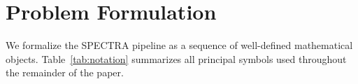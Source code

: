 %
%

\section{Problem Formulation}
\label{sec:problem}

We formalize the \textsc{SPECTRA} pipeline as a sequence of well-defined
mathematical objects.  Table~\ref{tab:notation} summarizes all principal
symbols used throughout the remainder of the paper.

